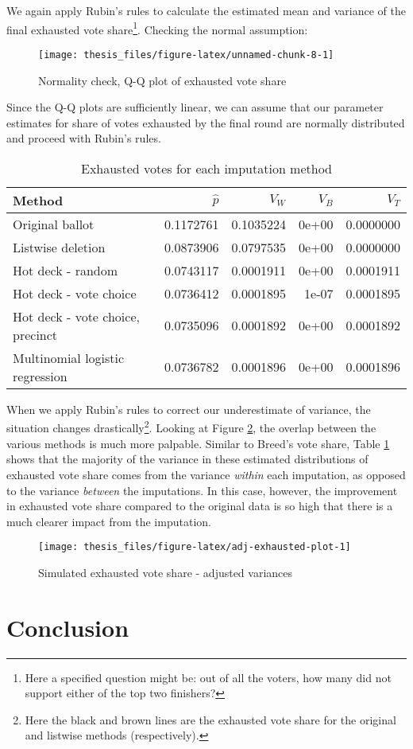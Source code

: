 \documentclass[12pt,twoside]{reedthesis}
\begin{document}
We again apply Rubin's rules to calculate the estimated mean and variance of the final exhausted vote share\footnote{Here a specified question might be: out of all the voters, how many did not support either of the top two finishers?}. Checking the normal assumption:
\begin{figure}
\texttt{[image: thesis\_files/figure-latex/unnamed-chunk-8-1]} \caption{Normality check, Q-Q plot of exhausted vote share}\label{fig:unnamed-chunk-8}
\end{figure}
Since the Q-Q plots are sufficiently linear, we can assume that our parameter estimates for share of votes exhausted by the final round are normally distributed and proceed with Rubin's rules.
\begin{table}[t]

\caption[Simulated exhausted votes]{\label{tab:adj-exhausted-tab}Exhausted votes for each imputation method}
\centering
\begin{tabular}{lrrrr}
\toprule
Method & $\hat{p}$ & $V_W$ & $V_B$ & $V_T$\\
\midrule
Original ballot & 0.1172761 & 0.1035224 & 0e+00 & 0.0000000\\
Listwise deletion & 0.0873906 & 0.0797535 & 0e+00 & 0.0000000\\
Hot deck - random & 0.0743117 & 0.0001911 & 0e+00 & 0.0001911\\
Hot deck - vote choice & 0.0736412 & 0.0001895 & 1e-07 & 0.0001895\\
Hot deck - vote choice, precinct & 0.0735096 & 0.0001892 & 0e+00 & 0.0001892\\
\addlinespace
Multinomial logistic regression & 0.0736782 & 0.0001896 & 0e+00 & 0.0001896\\
\bottomrule
\end{tabular}
\end{table}
When we apply Rubin's rules to correct our underestimate of variance, the situation changes drastically\footnote{Here the black and brown lines are the exhausted vote share for the original and listwise methods (respectively).}. Looking at Figure \ref{fig:adj-exhausted-plot}, the overlap between the various methods is much more palpable. Similar to Breed's vote share, Table \ref{tab:adj-exhausted-tab} shows that the majority of the variance in these estimated distributions of exhausted vote share comes from the variance \emph{within} each imputation, as opposed to the variance \emph{between} the imputations. In this case, however, the improvement in exhausted vote share compared to the original data is so high that there is a much clearer impact from the imputation.
\begin{figure}
\texttt{[image: thesis\_files/figure-latex/adj-exhausted-plot-1]} \caption{Simulated exhausted vote share - adjusted variances}\label{fig:adj-exhausted-plot}
\end{figure}
\hypertarget{conclusion}{%
\chapter*{Conclusion}\label{conclusion}}
\end{document}
